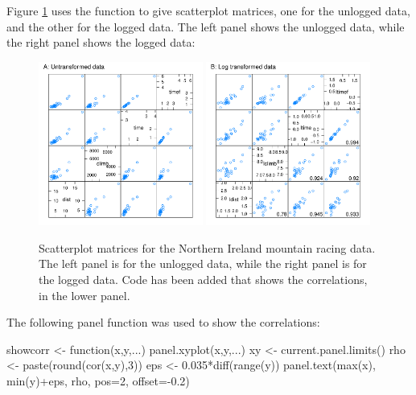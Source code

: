 Figure \ref{fig:nimra} uses the function
 to give scatterplot
matrices, one for the unlogged data, and the other for the logged
data.  The left panel shows the unlogged data, while the right panel
shows the logged data:
\begin{figure}
\vspace*{-6pt}
\begin{Schunk}


\centerline{\includegraphics[width=0.48\textwidth]{figs/03-nihills-spmAB-1} \includegraphics[width=0.48\textwidth]{figs/03-nihills-spmAB-2} }

\end{Schunk}
\caption{Scatterplot matrices for the Northern Ireland mountain racing
  data. The left panel is for the unlogged data, while the right panel is
for the logged data.  Code has been added that shows the correlations,
in the lower panel.\label{fig:nimra}}
\end{figure}
\vspace*{15pt}

The following panel function was used to show the correlations:
\begin{Schunk}
\begin{Sinput}
showcorr <- function(x,y,...){
    panel.xyplot(x,y,...)
    xy <- current.panel.limits()
    rho <- paste(round(cor(x,y),3))
    eps <- 0.035*diff(range(y))
    panel.text(max(x), min(y)+eps, rho,
               pos=2, offset=-0.2)
}
\end{Sinput}
\end{Schunk}

